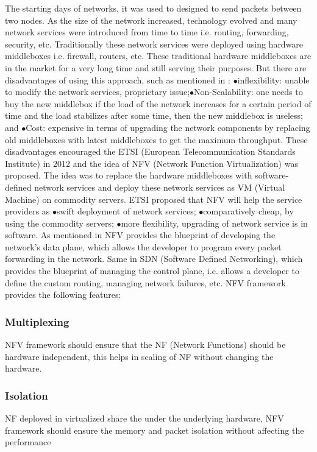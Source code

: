 \documentclass[10pt, a4paper, conference]{IEEEtran}
\begin{document}
The starting days of networks, it was used to designed to send packets between two nodes. As the size of the network increased, technology evolved and many network services were introduced from time to time i.e. routing, forwarding, security, etc. Traditionally these network services were deployed using hardware middleboxes i.e. firewall, routers, etc. These traditional hardware middleboxes are in the market for a very long time and still serving their purposes. But there are disadvantages of using this approach, such as mentioned in \cite{Philippov2017}: 
$\bullet$inflexibility: unable to modify the network services, proprietary issue;$\bullet$Non-Scalability: one needs to buy the new middlebox if the load of the network increases for a certain period of time and the load stabilizes after some time, then the new middlebox is useless; and $\bullet$Cost: expensive in terms of  upgrading the network components by replacing old middleboxes with latest middleboxes to get the maximum throughput. These disadvantages encouraged the ETSI\cite{ETSI2012} (European Telecommunication Standards Institute) in 2012 and the idea of NFV (Network Function Virtualization) was proposed. The idea was to replace the hardware middleboxes with software-defined network services and deploy these network services as VM (Virtual Machine) on commodity servers. ETSI proposed that NFV will help the service providers as $\bullet$swift deployment of network services; $\bullet$comparatively cheap, by using the commodity servers; $\bullet$more flexibility, upgrading of network service is in software. As mentioned in \cite{Panda2017} NFV provides the blueprint of developing the network’s data plane, which allows the developer to program every packet forwarding in the network. Same in SDN (Software Defined Networking), which provides the blueprint of managing the control plane, i.e. allows a developer to define the custom routing, managing network failures, etc. NFV framework provides the following features\cite{Panda2017}:
\subsubsection{Multiplexing} NFV framework should ensure that the NF (Network Functions) should be hardware independent, this helps in scaling of NF without changing the hardware.
\subsubsection{Isolation} NF deployed in virtualized share the under the underlying hardware, NFV framework should ensure the memory and packet isolation without affecting the performance 
\end{document}
